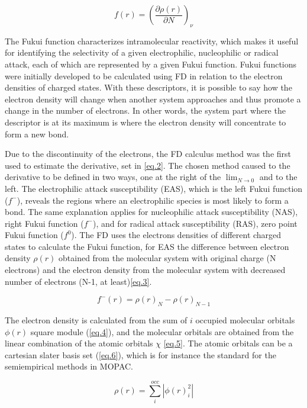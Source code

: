 \documentclass[a4paper,11pt]{refart}
\begin{document}
\begin{equation}
f(r) = \left(\frac{\partial \rho(r)}{\partial N} \right)_\nu
\label{eq.2}
\end{equation}

The Fukui function characterizes intramolecular reactivity, which makes it useful for identifying the selectivity of a given electrophilic, nucleophilic or radical attack, each of which are represented by a given Fukui function. Fukui functions were initially developed to be calculated using FD in relation to the electron densities of charged states. With these descriptors, it is possible to say how the electron density will change when another system approaches and thus promote a change in the number of electrons. In other words, the system part where the descriptor is at its maximum is where the electron density will concentrate to form a new bond.

Due to the discontinuity of the electrons, the FD calculus method was the first used to estimate the derivative, set in \autoref{eq.2}. The chosen method caused to the derivative to be defined in two ways, one at the right of the $ \lim_{N \to 0}$ and to the left.  The electrophilic attack susceptibility (EAS), which is the left Fukui function ($f^{-}$), reveals the regions where an electrophilic species is most likely to form a bond. The same explanation applies for nucleophilic attack susceptibility (NAS), right Fukui function ($f^{-}$), and for radical attack susceptibility (RAS), zero point Fukui function ($f^{0}$). The FD uses the electrons densities of different charged states to calculate the Fukui function, for EAS the difference between electron density $\rho(r)$ obtained from the molecular system with original charge (N electrons) and the electron density from the molecular system with decreased number of electrons (N-1, at least)\autoref{eq.3}. 

\begin{equation}
f^{-}(r) = \rho(r)_{N} -\rho(r)_{N-1}
\label{eq.3}
\end{equation}

The electron density is calculated from the sum of $i$ occupied molecular orbitals $\phi(r)$ square module (\autoref{eq.4}), and the molecular orbitals are obtained from the linear combination of the atomic orbitals $\chi$ \autoref{eq.5}. The atomic orbitals can be a cartesian slater basis set (\autoref{eq.6}), which is for instance the standard for the semiempirical methods in MOPAC.  

\begin{equation}
\rho(r) = \sum_{i}^{occ} |\phi(r)^2_i|
\label{eq.4} 
\end{equation}
\end{document}
